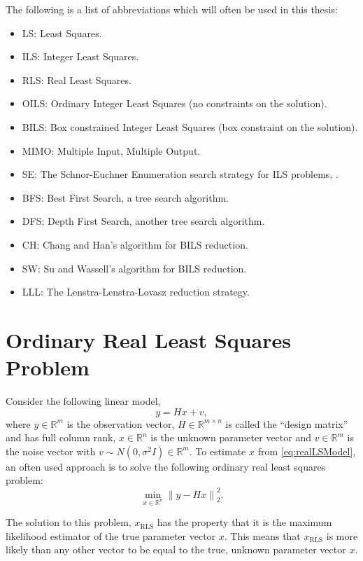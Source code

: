 \documentclass[12pt,Bold,letterpaper]{mcgilletdclass}
\newcommand{\be}{\begin{equation}}
\newcommand{\ee}{\end{equation}}
\begin{document}
The following is a list of abbreviations which will often be used in this thesis:
\begin{itemize}
\item LS: Least Squares.
\item ILS: Integer Least Squares.
\item RLS: Real Least Squares.
\item OILS: Ordinary Integer Least Squares (no constraints on the solution).
\item BILS: Box constrained Integer Least Squares (box constraint on the solution).
\item MIMO: Multiple Input, Multiple Output.
\item SE: The Schnor-Euchner Enumeration search strategy for ILS problems, \cite{SchE94}.
\item BFS: Best First Search, a tree search algorithm.
\item DFS: Depth First Search, another tree search algorithm.
\item CH: Chang and Han's algorithm for BILS reduction.
\item SW: Su and Wassell's algorithm for BILS reduction.
\item LLL: The Lenstra-Lenstra-Lovasz reduction strategy.
\end{itemize}

\section{Ordinary Real Least Squares Problem}
Consider the following linear model,
\begin{equation}
\label{eq:realLSModel}
y = Hx+v,
\end{equation}
where $y\in\mathbb{R}^m$ is the observation vector, $H\in\mathbb{R}^{m \times n}$ is called the
``design matrix'' and has full column rank, $x \in \mathbb{R}^n$ is the unknown parameter vector and $v \in \mathbb{R}^m$ is the noise vector with $v \sim N(0,\sigma^2I) \in\mathbb{R}^m$. To estimate $x$ from \eqref{eq:realLSModel}, an often used approach is to solve the following ordinary real least squares problem:
\be
\label{eq:realLSResidual}
	\min_{x \in \mathbb{R}^n} \left \| y- Hx \right \|^2_2.
\ee

The solution to this problem, $x_{\scriptscriptstyle{\mathrm{RLS}}}$ has the property that it is the maximum likelihood estimator of the true parameter vector $x$. This means that $x_{\scriptscriptstyle{\mathrm{RLS}}}$ is more likely than any other vector to be equal to the true, unknown parameter vector $x$. 
\end{document}
